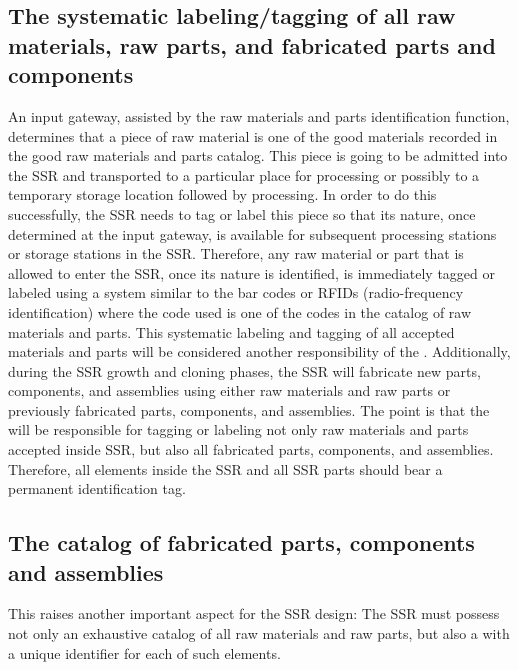 \subsection[The systematic labeling/tagging of all raw materials, raw parts, and fabricated parts and components]{The systematic labeling/tagging of all raw materials, raw parts, and fabricated parts
and components}

An input gateway,
assisted by the raw materials and parts identification function,
determines that a piece of raw material is one of the good materials
recorded in the good raw materials and parts catalog. This piece is
going to be admitted into the SSR and transported to a particular place
for processing or possibly to a temporary storage location followed by
processing.  In order to do this successfully, the SSR needs
to tag or label this piece so that its nature, once
determined at the input gateway, is available for
subsequent processing stations or storage stations in the SSR. Therefore,
any raw material or part that is allowed to enter the SSR, once
its nature is identified, is immediately tagged or labeled using a system
similar to the bar codes or RFIDs (radio-frequency identification)
where the code used is one of the codes in the catalog of raw materials
and parts. This systematic labeling and tagging of all accepted
materials and parts will be considered another responsibility of the
.  Additionally,
during the SSR growth and cloning phases, the SSR will fabricate new parts, components, and assemblies
using either raw materials and raw parts or previously fabricated
parts, components, and assemblies. The point is that the 
will be responsible for tagging or labeling not
only raw materials and parts accepted inside SSR, but also all
fabricated parts, components, and assemblies. Therefore,
all elements inside the SSR and all SSR parts should bear
a permanent identification tag.

\subsection[The catalog of fabricated parts, components and assemblies]{The catalog of fabricated parts, components and assemblies}

This raises another
important aspect for the SSR design: The SSR must possess not only an
exhaustive catalog of all raw materials and raw parts, but also a
with a unique identifier for each  of such elements. 

